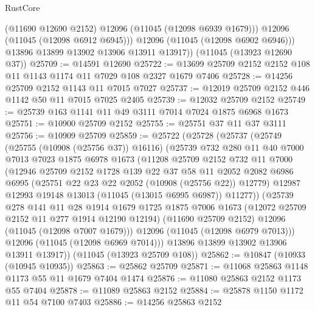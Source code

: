 \begin{lexlean}{RustCore}
\begin{coremodule}
              (@11690 @12690 @2152)
              @12096
              (@11045 (@12098 @6939 @1679)))
            @12096
            (@11045 (@12098 @6912 @6945)))
          @12096
          (@11045 (@12098 @6902 @6946)))
        @13896
        @13899
        @13902
        @13906
        @13911
        @13917))
    (@11045 (@13923 @12690 @37))
@25709 := @14591 @12690
@25722 := @13699 @25709 @2152 @2152 @108 @11 @1143 @1174 @11 @7029 @108 @2327 @1679 @7406
@25728 := @14256 @25709 @2152 @1143 @11 @7015 @7027
@25737 := @12019 @25709 @2152 @446 @1142 @50 @11 @7015 @7025 @2405
@25739 := @12032 @25709 @2152
@25749 := @25739 @163 @1141 @11 @49 @3111 @7014 @7024 @1875 @6968 @1673
@25751 := @10900 @25709 @2152
@25755 := @25751 @37 @11 @37 @3111
@25756 := @10909 @25709
@25859 := @25722
    (@25728
      (@25737
        (@25749
          (@25755 (@10908 (@25756 @37)) @16116)
          (@25739
            @732
            @280
            @11
            @40
            @7000
            @7013
            @7023
            @1875
            @6978
            @1673
            (@11208
              @25709
              @2152
              @732
              @11
              @7000
              (@12946
                @25709
                @2152
                @1728
                @139
                @22
                @37
                @58
                @11
                @2052
                @2082
                @6986
                @6995
                (@25751 @22 @23 @22 @2052 (@10908 (@25756 @22)) @12779)
                @12987
                @12993
                @19148
                @13013
                (@11045 (@13015 @6995 @6987))
                @11277))
            (@25739
              @278
              @141
              @11
              @28
              @1914
              @1679
              @1725
              @1875
              @7006
              @1673
              (@12072 @25709 @2152 @11 @277 @1914 @12190 @12194)
              (@11690 @25709 @2152)
              @12096
              (@11045 (@12098 @7007 @1679)))
            @12096
            (@11045 (@12098 @6979 @7013)))
          @12096
          (@11045 (@12098 @6969 @7014)))
        @13896
        @13899
        @13902
        @13906
        @13911
        @13917))
    (@11045 (@13923 @25709 @108))
@25862 := @10847 (@10933 (@10945 @10935))
@25863 := @25862 @25709
@25871 := @11068 @25863 @1148 @1173 @55 @11 @1679 @7404 @1474
@25876 := @11080 @25863 @2152 @1173 @55 @7404
@25878 := @11089 @25863 @2152
@25884 := @25878 @1150 @1172 @11 @54 @7100 @7403
@25886 := @14256 @25863 @2152

\end{coremodule}
\end{lexlean}
